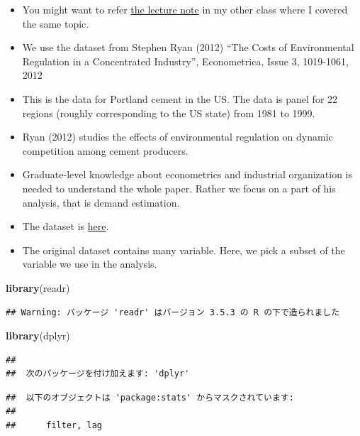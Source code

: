 \documentclass[]{book}
\newenvironment{Shaded}{\begin{snugshade}}{\end{snugshade}}
\newcommand{\KeywordTok}[1]{\textcolor[rgb]{0.13,0.29,0.53}{\textbf{#1}}}
\newcommand{\NormalTok}[1]{#1}
\begin{document}
\begin{itemize}
\item
  You might want to refer \href{IV_Examples_190524.pdf}{the lecture
  note} in my other class where I covered the same topic.
\item
  We use the dataset from Stephen Ryan (2012) ``The Costs of
  Environmental Regulation in a Concentrated Industry'', Econometrica,
  Issue 3, 1019-1061, 2012
\item
  This is the data for Portland cement in the US. The data is panel for
  22 regions (roughly corresponding to the US state) from 1981 to 1999.
\item
  Ryan (2012) studies the effects of environmental regulation on dynamic
  competition among cement producers.
\item
  Graduate-level knowledge about econometrics and industrial
  organization is needed to understand the whole paper. Rather we focus
  on a part of his analysis, that is demand estimation.
\item
  The dataset is \href{cementDec2009.csv}{here}.
\item
  The original dataset contains many variable. Here, we pick a subset of
  the variable we use in the analysis.
\end{itemize}

\begin{Shaded}
\begin{Highlighting}[]
\KeywordTok{library}\NormalTok{(readr)}
\end{Highlighting}
\end{Shaded}

\begin{verbatim}
## Warning: パッケージ 'readr' はバージョン 3.5.3 の R の下で造られました
\end{verbatim}

\begin{Shaded}
\begin{Highlighting}[]
\KeywordTok{library}\NormalTok{(dplyr)}
\end{Highlighting}
\end{Shaded}

\begin{verbatim}
## 
##  次のパッケージを付け加えます: 'dplyr'
\end{verbatim}

\begin{verbatim}
##  以下のオブジェクトは 'package:stats' からマスクされています: 
## 
##      filter, lag
\end{verbatim}
\end{document}
